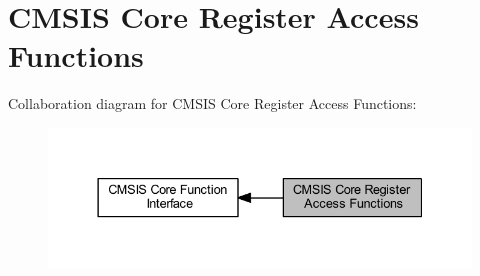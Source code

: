 \hypertarget{group___c_m_s_i_s___core___reg_acc_functions}{}\section{C\+M\+S\+IS Core Register Access Functions}
\label{group___c_m_s_i_s___core___reg_acc_functions}
Collaboration diagram for C\+M\+S\+IS Core Register Access Functions\+:
\nopagebreak
\begin{figure}[H]
\begin{center}
\leavevmode
\includegraphics[width=337pt]{group___c_m_s_i_s___core___reg_acc_functions}
\end{center}
\end{figure}
